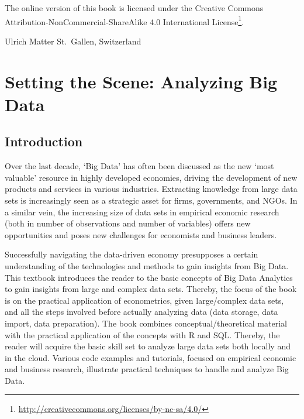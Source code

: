 \documentclass[
  12pt,
]{style/krantz}
\renewcommand{\href}[2]{#2\footnote{\url{#1}}}
\begin{document}
The online version of this book is licensed under the \href{http://creativecommons.org/licenses/by-nc-sa/4.0/}{Creative Commons Attribution-NonCommercial-ShareAlike 4.0 International License}.

\begin{flushright}
Ulrich Matter
St.~Gallen, Switzerland
\end{flushright}

\mainmatter

\hypertarget{part-setting-the-scene-analyzing-big-data}{%
\part{Setting the Scene: Analyzing Big Data}\label{part-setting-the-scene-analyzing-big-data}}

\hypertarget{introduction}{%
\chapter{Introduction}\label{introduction}}

Over the last decade, `Big Data' has often been discussed as the new `most valuable'
resource in highly developed economies, driving the development of new
products and services in various industries. Extracting knowledge from large data
sets is increasingly seen as a strategic asset for firms, governments, and NGOs. In a similar vein, the increasing size of data sets in empirical economic research (both in number
of observations and number of variables) offers new opportunities and poses new
challenges for economists and business leaders.

Successfully navigating the data-driven economy presupposes a certain
understanding of the technologies and methods to gain insights from Big Data.
This textbook introduces the reader to the basic concepts of Big Data Analytics to
gain insights from large and complex data sets. Thereby, the focus of the book
is on the practical application of econometrics, given
large/complex data sets, and all the steps involved before actually analyzing data (data storage, data import, data preparation).
The book combines conceptual/theoretical material with the practical application of the
concepts with R and SQL. Thereby, the reader will
acquire the basic skill set to analyze large data sets both locally and in the
cloud. Various code examples and tutorials, focused on empirical economic and business research, illustrate
practical techniques to handle and analyze Big Data.
\end{document}
